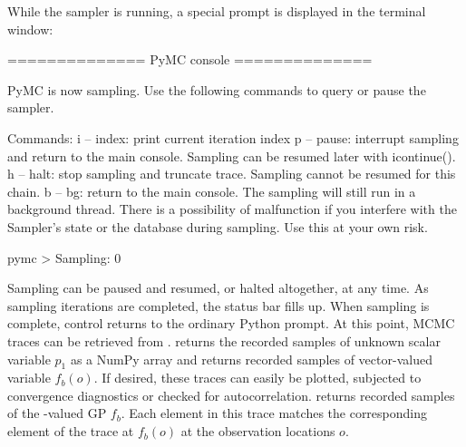 \documentclass[article]{jss}
\begin{document}
While the sampler is running, a special prompt is displayed in the terminal window:
\begin{tiny}
    \begin{CodeInput}
        ==============
         PyMC console
        ==============

                PyMC is now sampling. Use the following commands to query or pause the sampler.


                Commands:
                  i -- index: print current iteration index
                  p -- pause: interrupt sampling and return to the main console.
                              Sampling can be resumed later with icontinue().
                  h -- halt:  stop sampling and truncate trace. Sampling cannot be
                              resumed for this chain.
                  b -- bg:    return to the main console. The sampling will still
                              run in a background thread. There is a possibility of
                              malfunction if you interfere with the Sampler's
                              state or the database during sampling. Use this at your
                              own risk.

        pymc > Sampling:   0%
    \end{CodeInput}    
\end{tiny}
Sampling can be paused and resumed, or halted altogether, at any time. As sampling iterations are completed, the status bar fills up. When sampling is complete, control returns to the ordinary Python prompt. At this point, MCMC traces can be retrieved from .  returns the recorded samples of unknown scalar variable $p_1$ as a NumPy array and  returns recorded samples of vector-valued variable $f_b(o)$. If desired, these traces can easily be plotted, subjected to convergence diagnostics or checked for autocorrelation.  returns recorded samples of the -valued GP $f_b$. Each element in this trace matches the corresponding element of the trace at $f_b(o)$ at the observation locations $o$.
\end{document}
